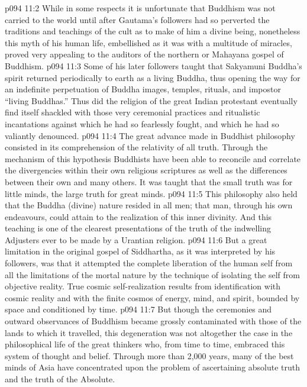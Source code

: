 \vs p094 11:2 \pc While in some respects it is unfortunate that Buddhism was not carried to the world until after Gautama’s followers had so perverted the traditions and teachings of the cult as to make of him a divine being, nonetheless this myth of his human life, embellished as it was with a multitude of miracles, proved very appealing to the auditors of the northern or Mahayana gospel of Buddhism.
\vs p094 11:3 Some of his later followers taught that Sakyamuni Buddha’s spirit returned periodically to earth as a living Buddha, thus opening the way for an indefinite perpetuation of Buddha images, temples, rituals, and impostor “living Buddhas.” Thus did the religion of the great Indian protestant eventually find itself shackled with those very ceremonial practices and ritualistic incantations against which he had so fearlessly fought, and which he had so valiantly denounced.
\vs p094 11:4 \pc The great advance made in Buddhist philosophy consisted in its comprehension of the relativity of all truth. Through the mechanism of this hypothesis Buddhists have been able to reconcile and correlate the divergencies within their own religious scriptures as well as the differences between their own and many others. It was taught that the small truth was for little minds, the large truth for great minds.
\vs p094 11:5 This philosophy also held that the Buddha (divine) nature resided in all men; that man, through his own endeavours, could attain to the realization of this inner divinity. And this teaching is one of the clearest presentations of the truth of the indwelling Adjusters ever to be made by a Urantian religion.
\vs p094 11:6 But a great limitation in the original gospel of Siddhartha, as it was interpreted by his followers, was that it attempted the complete liberation of the human self from all the limitations of the mortal nature by the technique of isolating the self from objective reality. True cosmic self\hyp{}realization results from identification with cosmic reality and with the finite cosmos of energy, mind, and spirit, bounded by space and conditioned by time.
\vs p094 11:7 But though the ceremonies and outward observances of Buddhism became grossly contaminated with those of the lands to which it travelled, this degeneration was not altogether the case in the philosophical life of the great thinkers who, from time to time, embraced this system of thought and belief. Through more than 2,000 years, many of the best minds of Asia have concentrated upon the problem of ascertaining absolute truth and the truth of the Absolute.
